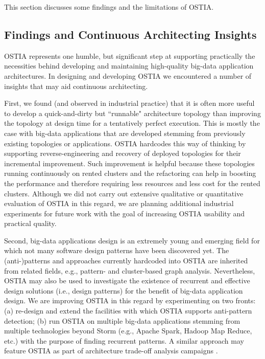 This section discusses some findings and the limitations of OSTIA.

\subsection{Findings and Continuous Architecting Insights}

OSTIA represents one humble, but significant step at supporting practically the necessities behind developing and maintaining high-quality big-data application architectures. In designing and developing OSTIA we encountered a number of insights that may aid continuous architecting.

First, we found (and observed in industrial practice) that it is often more useful to develop a quick-and-dirty but ``runnable" architecture topology than improving the topology at design time for a tentatively perfect execution. This is mostly the case with big-data applications that are developed stemming from previously existing topologies or applications. OSTIA hardcodes this way of thinking by supporting reverse-engineering and recovery of deployed topologies for their incremental improvement. Such improvement is helpful because these topologies running continuously on rented clusters and the refactoring can help in boosting the performance and therefore requiring less resources and less cost for the rented clusters. Although we did not carry out extensive qualitative or quantitative evaluation of OSTIA in this regard, we are planning additional industrial experiments for future work with the goal of increasing OSTIA usability and practical quality.

Second, big-data applications design is an extremely young and emerging field for which not many software design patterns have been discovered yet. The (anti-)patterns and approaches currently hardcoded into OSTIA are inherited from related fields, e.g., pattern- and cluster-based graph analysis. Nevertheless, OSTIA may also be used to investigate the existence of recurrent and effective design solutions (i.e., design patterns) for the benefit of big-data application design. We are improving OSTIA in this regard by experimenting on two fronts: (a) re-design and extend the facilities with which OSTIA supports anti-pattern detection; (b) run OSTIA on multiple big-data applications stemming from multiple technologies beyond Storm (e.g., Apache Spark, Hadoop Map Reduce, etc.) with the purpose of finding recurrent patterns. A similar approach may feature OSTIA as part of architecture trade-off analysis campaigns \cite{atam}.

